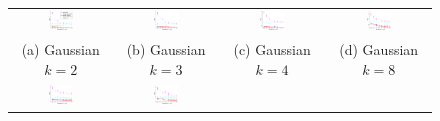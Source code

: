 \documentclass{article}
\begin{document}
\begin{figure}[!t]
  \hspace{-6mm}
  \renewcommand{\tabcolsep}{1pt}
  \begin{tabular}{cccc}
    \includegraphics[width=0.26\textwidth]{../experiment/figure_new/sp_diff_gauss_k_2_view_2-crop} &
    \includegraphics[width=0.26\textwidth]{../experiment/figure_new/sp_diff_gauss_k_3_view_3-crop} &
    \includegraphics[width=0.26\textwidth]{../experiment/figure_new/sp_diff_gauss_k_4_view_1-crop} &
    \includegraphics[width=0.26\textwidth]{../experiment/figure_new/sp_diff_gauss_k_8_view_1-crop} \\[-1mm]
    (a) Gaussian $k=2$ & (b) Gaussian $k=3$ & (c) Gaussian $k=4$ & (d) Gaussian $k=8$ \\[-1mm]
    \includegraphics[width=0.26\textwidth]{../experiment/figure_new/sp_diff_heter_k_2_view_2-crop} &
    \includegraphics[width=0.26\textwidth]{../experiment/figure_new/sp_diff_heter_k_3_view_3-crop} &

\end{tabular}
\end{figure}
\end{document}
